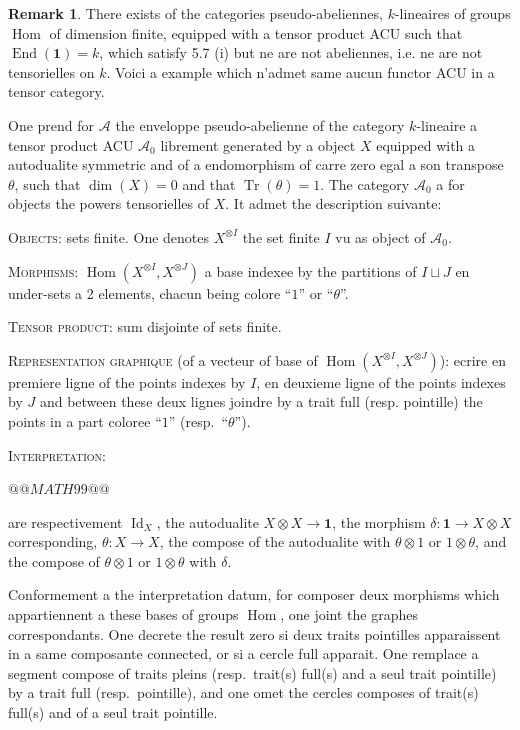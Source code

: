 \documentclass[11pt,a4paper]{article}
\theoremstyle{plain}
\theoremstyle{definition}
\newtheorem{remark}[theorem]{Remark}
\DeclareMathOperator{\Hom}{Hom}
\DeclareMathOperator{\End}{End}
\DeclareMathOperator{\Tr}{Tr}
\DeclareMathOperator{\Id}{Id}
\begin{document}
\begin{remark}
There exists of the categories pseudo-abeliennes, $k$-lineaires of groups $\Hom$ of dimension finite, equipped with a tensor product ACU such that $\End(\mathbf{1}) = k$, which satisfy 5.7 (i) but ne are not abeliennes, i.e. ne are not tensorielles on $k$. Voici a example which n'admet same aucun functor ACU in a tensor category.

One prend for $\mathcal{A}$ the enveloppe pseudo-abelienne of the category $k$-lineaire a tensor product ACU $\mathcal{A}_0$ librement generated by a object $X$ equipped with a autodualite symmetric and of a endomorphism of carre zero egal a son transpose $\theta$, such that $\dim(X) = 0$ and that $\Tr(\theta) = 1$. The category $\mathcal{A}_0$ a for objects the powers tensorielles of $X$. It admet the description suivante:

\textsc{Objects}: sets finite. One denotes $X^{\otimes I}$ the set finite $I$ vu as object of $\mathcal{A}_0$.

\textsc{Morphisms}: $\Hom(X^{\otimes I}, X^{\otimes J})$ a base indexee by the partitions of $I \sqcup J$ en under-sets a 2 elements, chacun being colore ``$1$'' or ``$\theta$''.

\textsc{Tensor product}: sum disjointe of sets finite.

\textsc{Representation graphique} (of a vecteur of base of $\Hom(X^{\otimes I}, X^{\otimes J})$): ecrire en premiere ligne of the points indexes by $I$, en deuxieme ligne of the points indexes by $J$ and between these deux lignes joindre by a trait full (resp. pointille) the points in a part coloree ``$1$'' (resp.~``$\theta$'').

\textsc{Interpretation}:

\begin{center}
$@@MATH99@@$
\end{center}

are respectivement $\Id_X$, the autodualite $X \otimes X \to \mathbf{1}$, the morphism $\delta : \mathbf{1} \to X \otimes X$ corresponding, $\theta : X \to X$, the compose of the autodualite with $\theta \otimes 1$ or $1 \otimes \theta$, and the compose of $\theta \otimes 1$ or $1 \otimes \theta$ with $\delta$.

Conformement a the interpretation datum, for composer deux morphisms which appartiennent a these bases of groups $\Hom$, one joint the graphes correspondants. One decrete the result zero si deux traits pointilles apparaissent in a same composante connected, or si a cercle full apparait. One remplace a segment compose of traits pleins (resp.~trait(s) full(s) and a seul trait pointille) by a trait full (resp.~pointille), and one omet the cercles composes of trait(s) full(s) and of a seul trait pointille.


\end{remark}
\end{document}

